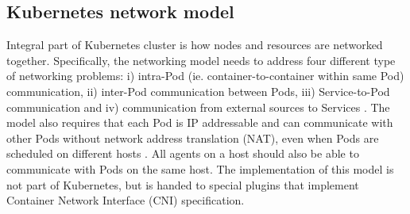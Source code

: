 \documentclass[english,12pt,a4paper,pdftex,sci,utf8]{aaltothesis}
\begin{document}
\subsection{Kubernetes network model}



Integral part of Kubernetes cluster is how nodes and resources are networked together. Specifically, the networking model needs to address four different type of networking problems: i) intra-Pod (ie. container-to-container within same Pod) communication, ii) inter-Pod communication between Pods, iii) Service-to-Pod communication and iv) communication from external sources to Services \cite{k8s-docs-cluster-networking}. The model also requires that each Pod is IP addressable and can communicate with other Pods without network address translation (NAT), even when Pods are scheduled on different hosts \cite{qi2020assessing}. All agents on a host should also be able to communicate with Pods on the same host. The implementation of this model is not part of Kubernetes, but is handed to special plugins that implement Container Network Interface (CNI) specification.




\end{document}
